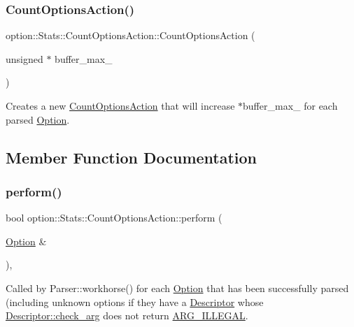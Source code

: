 \subsubsection{\texorpdfstring{Count\+Options\+Action()}{CountOptionsAction()}}
{\footnotesize\ttfamily option\+::\+Stats\+::\+Count\+Options\+Action\+::\+Count\+Options\+Action (\begin{DoxyParamCaption}\item[{unsigned $\ast$}]{buffer\+\_\+max\+\_\+ }\end{DoxyParamCaption})\hspace{0.3cm}{\ttfamily [inline]}}

Creates a new \hyperlink{classoption_1_1Stats_1_1CountOptionsAction}{Count\+Options\+Action} that will increase {\ttfamily $\ast$buffer\+\_\+max\+\_\+} for each parsed \hyperlink{classoption_1_1Option}{Option}. 

\subsection{Member Function Documentation}
\mbox{\label{classoption_1_1Stats_1_1CountOptionsAction_a29ab8a68d0a30736b99b4d2e5dece489}} 
\subsubsection{\texorpdfstring{perform()}{perform()}}
{\footnotesize\ttfamily bool option\+::\+Stats\+::\+Count\+Options\+Action\+::perform (\begin{DoxyParamCaption}\item[{\hyperlink{classoption_1_1Option}{Option} \&}]{ }\end{DoxyParamCaption})\hspace{0.3cm}{\ttfamily [inline]}, {\ttfamily [virtual]}}



Called by Parser\+::workhorse() for each \hyperlink{classoption_1_1Option}{Option} that has been successfully parsed (including unknown options if they have a \hyperlink{structoption_1_1Descriptor}{Descriptor} whose \hyperlink{structoption_1_1Descriptor_aa5d675dba0214a4abd73007ff163cc67}{Descriptor\+::check\+\_\+arg} does not return \hyperlink{namespaceoption_aee8c76a07877335762631491e7a5a1a9a9528e32563b795bd2930b12d0a5e382d}{A\+R\+G\+\_\+\+I\+L\+L\+E\+G\+AL}. 

